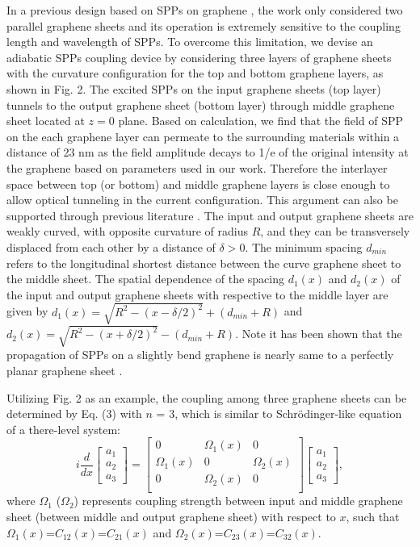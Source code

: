 \documentclass[preprint,12pt,numbers,sort&compress]{elsarticle}
\begin{document}
In a previous design based on SPPs on graphene \cite{Wang12}, the work only considered two parallel graphene sheets and its operation is extremely sensitive to the coupling length and wavelength of SPPs.
To overcome this limitation, we devise an adiabatic SPPs coupling device by considering three layers of graphene sheets with the curvature configuration for the top and bottom graphene layers, as shown in Fig. 2.
The excited SPPs on the input graphene sheets (top layer) tunnels to the output graphene sheet (bottom layer) through middle graphene sheet located at $z=0$ plane. Based on calculation, we find that the field of SPP on the each graphene layer can permeate to the surrounding materials within a distance of 23 nm as the field amplitude decays to 1/e of the original intensity at the graphene based on parameters used in our work. Therefore the interlayer space between top (or bottom) and middle graphene layers is close enough to allow optical tunneling in the current configuration. This argument can also be supported through previous literature \cite{Wang12}.
The input and output graphene sheets are weakly curved, with opposite curvature of radius $R$, and they can be transversely displaced from each other by a distance of $\delta > 0$.
The minimum spacing $d_{min}$ refers to the longitudinal shortest distance between the curve graphene sheet to the middle sheet.
The spatial dependence of the spacing $d_1(x)$ and $d_2(x)$ of the input and output graphene sheets with respective to the middle layer are given by $d_1(x)=\sqrt{R^2-(x-\delta/2)^2}+(d_{min}+R)$ and $d_2(x)=\sqrt{R^2-(x+\delta/2)^2}-(d_{min}+R)$.
Note it has been shown that the propagation of SPPs on a slightly bend graphene is nearly same to a perfectly planar graphene sheet \cite{Xiao15}.

Utilizing Fig. 2 as an example, the coupling among three graphene sheets can be determined by Eq. (3) with $n$ = 3, which is similar to Schr\"odinger-like equation of a there-level system:
\begin{equation}
i\dfrac{d}{d x}
\begin{bmatrix}
a_{1} \\
a_{2} \\
a_{3}
\end{bmatrix}
= \begin{bmatrix}
0 & \Omega_1(x) & 0 \\
\Omega_1(x) & 0 & \Omega_2(x) \\
0 & \Omega_2(x) & 0 \\
\end{bmatrix} \begin{bmatrix}
a_{1} \\
a_{2} \\
a_{3}
\end{bmatrix},
\end{equation}
where $\Omega_1$ ($\Omega_2$) represents coupling strength between input and middle graphene sheet (between middle and output graphene sheet) with respect to $x$, such that $\Omega_1(x)$=$C_{12}(x)$=$C_{21}(x)$ and $\Omega_2(x)$=$C_{23}(x)$=$C_{32}(x)$.
\end{document}
